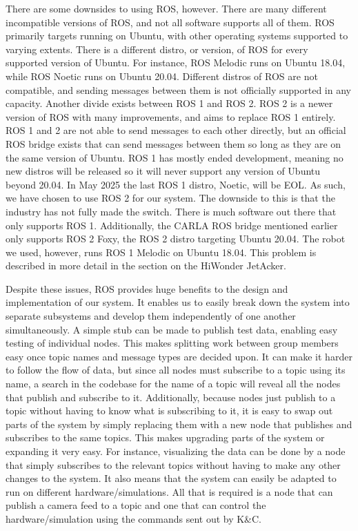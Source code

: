 \documentclass[titlepage,draft]{article}
\begin{document}
{There are some downsides to using ROS, however. There are many different incompatible versions of ROS, and not all software supports all of them. ROS primarily targets running on Ubuntu, with other operating systems supported to varying extents. There is a different distro, or version, of ROS for every supported version of Ubuntu. For instance, ROS Melodic runs on Ubuntu 18.04, while ROS Noetic runs on Ubuntu 20.04. Different distros of ROS are not compatible, and sending messages between them is not officially supported in any capacity. Another divide exists between ROS 1 and ROS 2. ROS 2 is a newer version of ROS with many improvements, and aims to replace ROS 1 entirely. ROS 1 and 2 are not able to send messages to each other directly, but an official ROS bridge exists that can send messages between them so long as they are on the same version of Ubuntu. ROS 1 has mostly ended development, meaning no new distros will be released so it will never support any version of Ubuntu beyond 20.04. In May 2025 the last ROS 1 distro, Noetic, will be EOL. As such, we have chosen to use ROS 2 for our system. The downside to this is that the industry has not fully made the switch. There is much software out there that only supports ROS 1. Additionally, the CARLA ROS bridge mentioned earlier only supports ROS 2 Foxy, the ROS 2 distro targeting Ubuntu 20.04. The robot we used, however, runs ROS 1 Melodic on Ubuntu 18.04. This problem is described in more detail in the section on the HiWonder JetAcker.

Despite these issues, ROS provides huge benefits to the design and implementation of our system. It enables us to easily break down the system into separate subsystems and develop them independently of one another simultaneously. A simple stub can be made to publish test data, enabling easy testing of individual nodes. This makes splitting work between group members easy once topic names and message types are decided upon. It can make it harder to follow the flow of data, but since all nodes must subscribe to a topic using its name, a search in the codebase for the name of a topic will reveal all the nodes that publish and subscribe to it. Additionally, because nodes just publish to a topic without having to know what is subscribing to it, it is easy to swap out parts of the system by simply replacing them with a new node that publishes and subscribes to the same topics. This makes upgrading parts of the system or expanding it very easy. For instance, visualizing the data can be done by a node that simply subscribes to the relevant topics without having to make any other changes to the system. It also means that the system can easily be adapted to run on different hardware/simulations. All that is required is a node that can publish a camera feed to a topic and one that can control the hardware/simulation using the commands sent out by K\&C.


}
\end{document}

